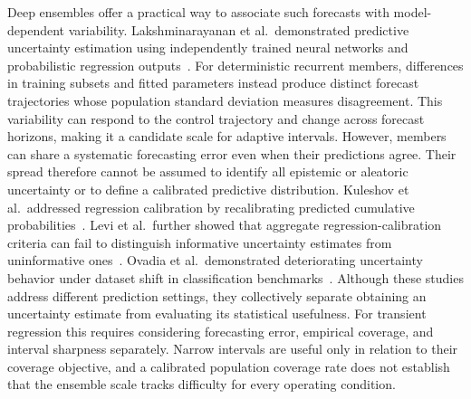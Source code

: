 Deep ensembles offer a practical way to associate such forecasts with model-dependent variability. Lakshminarayanan et al.\ demonstrated predictive uncertainty estimation using independently trained neural networks and probabilistic regression outputs~\cite{lakshminarayanan2017deep}. For deterministic recurrent members, differences in training subsets and fitted parameters instead produce distinct forecast trajectories whose population standard deviation measures disagreement. This variability can respond to the control trajectory and change across forecast horizons, making it a candidate scale for adaptive intervals. However, members can share a systematic forecasting error even when their predictions agree. Their spread therefore cannot be assumed to identify all epistemic or aleatoric uncertainty or to define a calibrated predictive distribution. Kuleshov et al.\ addressed regression calibration by recalibrating predicted cumulative probabilities~\cite{kuleshov2018calibrated}. Levi et al.\ further showed that aggregate regression-calibration criteria can fail to distinguish informative uncertainty estimates from uninformative ones~\cite{levi2022regression}. Ovadia et al.\ demonstrated deteriorating uncertainty behavior under dataset shift in classification benchmarks~\cite{ovadia2019shift}. Although these studies address different prediction settings, they collectively separate obtaining an uncertainty estimate from evaluating its statistical usefulness. For transient regression this requires considering forecasting error, empirical coverage, and interval sharpness separately. Narrow intervals are useful only in relation to their coverage objective, and a calibrated population coverage rate does not establish that the ensemble scale tracks difficulty for every operating condition.

